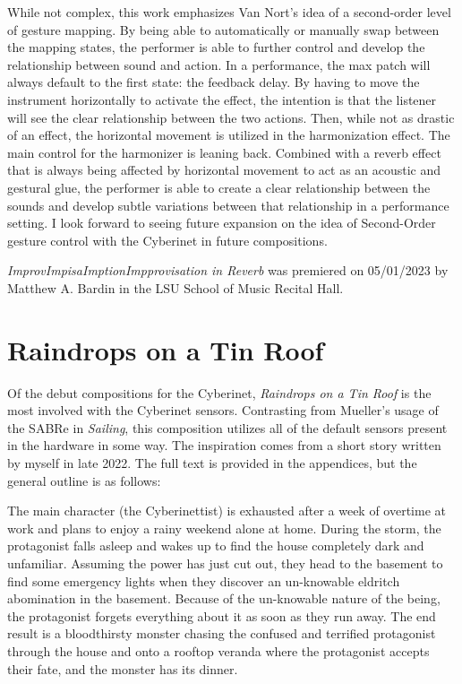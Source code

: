 While not complex, this work emphasizes Van Nort's idea of a second-order level of gesture mapping\cite{vanNortMapping2007}. By being able to automatically or manually swap between the mapping states, the performer is able to further control and develop the relationship between sound and action. In a performance, the max patch will always default to the first state: the feedback delay. By having to move the instrument horizontally to activate the effect, the intention is that the listener will see the clear relationship between the two actions. Then, while not as drastic of an effect, the horizontal movement is utilized in the harmonization effect. The main control for the harmonizer is leaning back. Combined with a reverb effect that is always being affected by horizontal movement to act as an acoustic and gestural glue, the performer is able to create a clear relationship between the sounds and develop subtle variations between that relationship in a performance setting. I look forward to seeing future expansion on the idea of Second-Order gesture control with the Cyberinet in future compositions.

\textit{ImprovImpisaImptionImpprovisation in Reverb} was premiered on 05/01/2023 by Matthew A. Bardin in the LSU School of Music Recital Hall.

\section{Raindrops on a Tin Roof}
Of the debut compositions for the Cyberinet, \textit{Raindrops on a Tin Roof} is the most involved with the Cyberinet sensors. Contrasting from Mueller's usage of the SABRe in \textit{Sailing}, this composition utilizes all of the default sensors present in the hardware in some way. The inspiration comes from a short story written by myself in late 2022. The full text is provided in the appendices, but the general outline is as follows:

The main character (the Cyberinettist) is exhausted after a week of overtime at work and plans to enjoy a rainy weekend alone at home. During the storm, the protagonist falls asleep and wakes up to find the house completely dark and unfamiliar. Assuming the power has just cut out, they head to the basement to find some emergency lights when they discover an un-knowable eldritch abomination in the basement. Because of the un-knowable nature of the being, the protagonist forgets everything about it as soon as they run away. The end result is a bloodthirsty monster chasing the confused and terrified protagonist through the house and onto a rooftop veranda where the protagonist accepts their fate, and the monster has its dinner.

